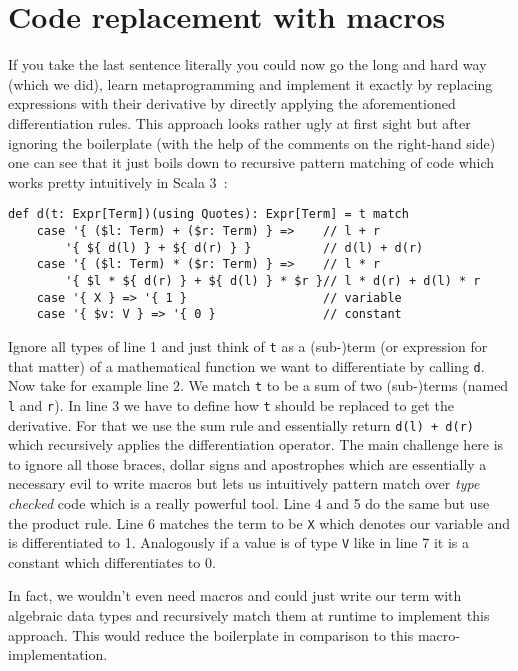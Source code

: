 \section{Code replacement with macros} \label{sec:macros}
If you take the last sentence literally you could now go the long and hard way (which we did), learn metaprogramming and implement it exactly by replacing expressions with their derivative by directly applying the aforementioned differentiation rules. This approach looks rather ugly at first sight but after ignoring the boilerplate (with the help of the comments on the right-hand side) one can see that it just boils down to recursive pattern matching of code which works pretty intuitively in Scala 3~\cite{maScala3}:
\begin{lstlisting}
def d(t: Expr[Term])(using Quotes): Expr[Term] = t match
    case '{ ($l: Term) + ($r: Term) } =>    // l + r
        '{ ${ d(l) } + ${ d(r) } }          // d(l) + d(r)
    case '{ ($l: Term) * ($r: Term) } =>    // l * r
        '{ $l * ${ d(r) } + ${ d(l) } * $r }// l * d(r) + d(l) * r
    case '{ X } => '{ 1 }                   // variable
    case '{ $v: V } => '{ 0 }               // constant
\end{lstlisting}
 Ignore all types of line 1 and just think of \lstinline{t} as a (sub-)term (or expression for that matter) of a mathematical function we want to differentiate by calling \lstinline{d}. Now take for example line 2. We match \lstinline{t} to be a sum of two (sub-)terms (named \lstinline{l} and \lstinline{r}). In line 3 we have to define how \lstinline{t} should be replaced to get the derivative. For that we use the sum rule and essentially return \lstinline{d(l) + d(r)} which recursively applies the differentiation operator. The main challenge here is to ignore all those braces, dollar signs and apostrophes which are essentially a necessary evil to write macros but lets us intuitively pattern match over \emph{type checked} code which is a really powerful tool. Line 4 and 5 do the same but use the product rule. Line 6 matches the term to be \lstinline{X} which denotes our variable and is differentiated to 1. Analogously if a value is of type \lstinline{V} like in line 7 it is a constant which differentiates to 0.

In fact, we wouldn't even need macros and could just write our term with algebraic data types and recursively match them at runtime to implement this approach. This would reduce the boilerplate in comparison to this macro-implementation.


